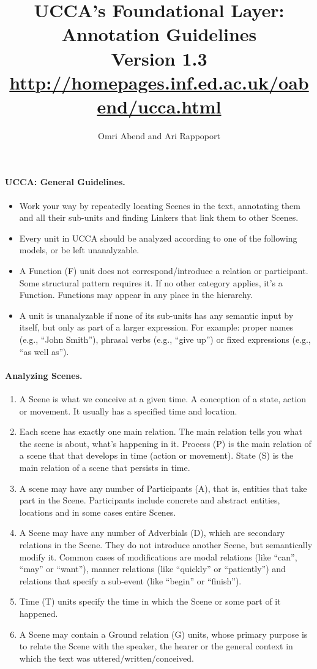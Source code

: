 \documentclass[11pt]{article}
\title{UCCA's Foundational Layer:  Annotation 	Guidelines \\
\normalsize{Version 1.3} \\ 
\url{http://homepages.inf.ed.ac.uk/oabend/ucca.html}}
\author{
Omri Abend and Ari Rappoport
}
\begin{document}
\paragraph{UCCA: General Guidelines.}

\begin{itemize}
\item
Work your way by repeatedly locating Scenes in the text, annotating them and all their sub-units and finding Linkers that link them to other Scenes. 
\item
Every unit in UCCA should be analyzed according to one of the following models, or be left unanalyzable. 
\item
A Function (F) unit does not correspond/introduce a relation or participant. Some structural pattern requires it. If no other category applies, it's a Function. Functions may appear in any place in the hierarchy.
\item
A unit is unanalyzable if none of its sub-units has any semantic input by itself, but only as part of a larger expression. For example: proper names (e.g., ``John Smith''), phrasal verbs (e.g., ``give up'') or fixed expressions (e.g., ``as well as'').
\end{itemize}

\paragraph{Analyzing Scenes.}

\begin{enumerate}
\item
A Scene is what we conceive at a given time. A conception of a state, action or movement. It usually has a specified time and location.
\item
Each scene has exactly one main relation. The main relation tells you what the scene is about, what's happening in it. Process (P) is the main relation of a scene that that develops in time (action or movement). State (S) is the main relation of a scene that persists in time.
\item
A scene may have any number of Participants (A), that is, entities that take part in the Scene. Participants include concrete and abstract entities, locations and in some cases entire Scenes. 
\item
A Scene may have any number of Adverbials (D), which are secondary relations in the Scene. They do not introduce another Scene, but semantically modify it. Common cases of modifications are modal relations (like ``can'', ``may'' or ``want''), manner relations (like ``quickly'' or ``patiently'') and relations that specify a sub-event (like ``begin'' or ``finish'').
\item
Time (T) units specify the time in which the Scene or some part of it happened.
\item
A Scene may contain a Ground relation (G) units, whose primary purpose is to relate the Scene with the speaker, the hearer or the general context in which the text was uttered/written/conceived.
\end{enumerate}
\end{document}
